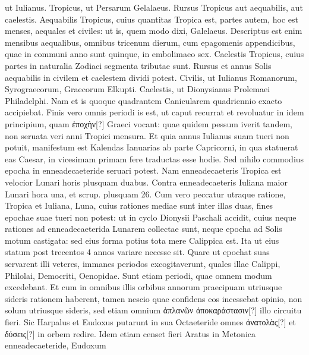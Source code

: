 ut Iulianus.
Tropicus, ut Persarum Gelalaeus.
Rursus Tropicus
aut aequabilis, aut caelestis.
Aequabilis
Tropicus, cuius quantitas
Tropica est, partes autem, hoc est menses, aequales et civiles: ut is,
quem modo dixi, Galelaeus.
%
Descriptus est enim mensibus aequalibus,
omnibus tricenum dierum, cum epagomenis appendicibus, quae
in communi anno sunt quinque, in embolimaeo sex.
Caelestis Tropicus,
cuius partes in naturalia Zodiaci segmenta tributae sunt.
Rursus
et annus Solis aequabilis in civilem et caelestem dividi potest.
Civilis,
ut Iulianus Romanorum, Syrograecorum, Graecorum Elkupti.
Caelestis,
ut Dionysianus Prolemaei Philadelphi.
Nam et is quoque quadrantem
Canicularem quadriennio exacto accipiebat.
Finis vero
omnis periodi is est, ut caput recurrat et revoluatur in idem principium,
quam \textgreek{ἐποχὴν[?]} Graeci vocant: quae quidem pessum iverit tandem,
non seruata veri anni Tropici mensura.
Et quia annus Iulianus
suam tueri non potuit, manifestum est Kalendas Ianuarias ab 
parte Capricorni, in qua statuerat eas Caesar, in vicesimam primam
fere traductas esse hodie.
Sed nihilo commodius epocha in enneadecaeteride
seruari potest.
Nam enneadecaeteris Tropica est velocior
Lunari horis plusquam duabus.
Contra enneadecaeteris Iuliana
maior Lunari hora una, et scrup. plusquam 26.
Cum vero peccatur
utraque ratione, Tropica et Iuliana, Luna, cuius rationes mediae sunt
inter illas duas, fines epochae suae tueri non potest: ut in cyclo Dionysii
Paschali accidit, cuius neque rationes ad enneadecaeterida Lunarem
collectae sunt, neque epocha ad Solis motum castigata: sed eius
forma potius tota mere Calippica est.
Ita ut eius statum post trecentos
4 annos variare necesse sit.
Quare ut epochat suas servarent illi veteres,
immanes periodos excogitaverunt, quales illae Calippi, Philolai, Democriti,
Oenopidae.
Sunt etiam periodi, quae omnem modum excedebant.
Et cum in omnibus illis orbibus annorum praecipuam
utriusque sideris rationem haberent, tamen nescio quae confidens eos
incessebat opinio, non solum utriusque sideris, sed etiam omnium
\textgreek{ἀπλανῶν ἀποκαράστασιν[?]} illo circuitu fieri.
Sic Harpalus et Eudoxus putarunt
in sua Octaeteride omnes \textgreek{ἀνατολὰς[?]}
 et \textgreek{δύσεις[?]} in orbem redire.
Idem etiam censet fieri Aratus in Metonica enneadecaeteride, Eudoxum
